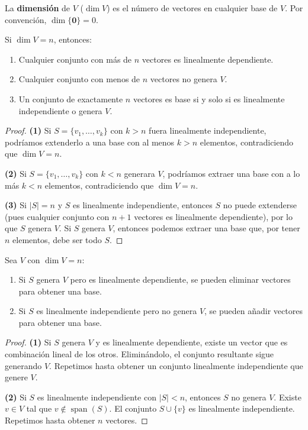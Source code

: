 \begin{definition}[Dimensión]
La \textbf{dimensión} de $V$ ($\dim V$) es el número de vectores en cualquier base de $V$. Por convención, $\dim \{\mathbf{0}\} = 0$.
\end{definition}

\begin{theorem}
Si $\dim V = n$, entonces:
\begin{enumerate}
\item Cualquier conjunto con más de $n$ vectores es linealmente dependiente.
\item Cualquier conjunto con menos de $n$ vectores no genera $V$.
\item Un conjunto de exactamente $n$ vectores es base si y solo si es linealmente independiente o genera $V$.
\end{enumerate}
\begin{proof}
\textbf{(1)} Si $S = \{v_1, \ldots, v_k\}$ con $k > n$ fuera linealmente independiente, podríamos extenderlo a una base con al menos $k > n$ elementos, contradiciendo que $\dim V = n$.

\textbf{(2)} Si $S = \{v_1, \ldots, v_k\}$ con $k < n$ generara $V$, podríamos extraer una base con a lo más $k < n$ elementos, contradiciendo que $\dim V = n$.

\textbf{(3)} Si $|S| = n$ y $S$ es linealmente independiente, entonces $S$ no puede extenderse (pues cualquier conjunto con $n+1$ vectores es linealmente dependiente), por lo que $S$ genera $V$. Si $S$ genera $V$, entonces podemos extraer una base que, por tener $n$ elementos, debe ser todo $S$.
\end{proof}
\end{theorem}

\begin{theorem}
Sea $V$ con $\dim V = n$:
\begin{enumerate}
\item Si $S$ genera $V$ pero es linealmente dependiente, se pueden eliminar vectores para obtener una base.
\item Si $S$ es linealmente independiente pero no genera $V$, se pueden añadir vectores para obtener una base.
\end{enumerate}
\begin{proof}
\textbf{(1)} Si $S$ genera $V$ y es linealmente dependiente, existe un vector que es combinación lineal de los otros. Eliminándolo, el conjunto resultante sigue generando $V$. Repetimos hasta obtener un conjunto linealmente independiente que genere $V$.

\textbf{(2)} Si $S$ es linealmente independiente con $|S| < n$, entonces $S$ no genera $V$. Existe $v \in V$ tal que $v \notin \operatorname{span}(S)$. El conjunto $S \cup \{v\}$ es linealmente independiente. Repetimos hasta obtener $n$ vectores.
\end{proof}
\end{theorem}

